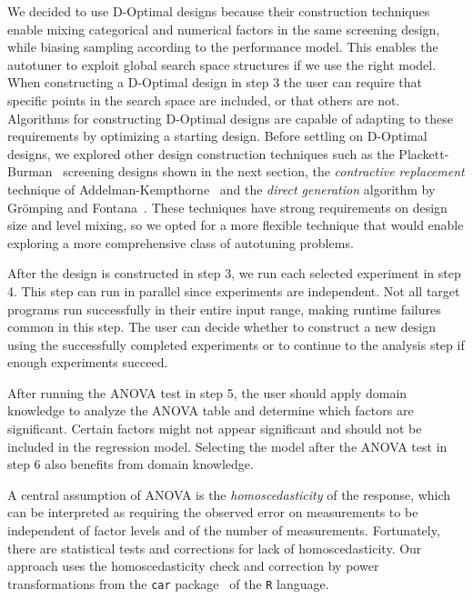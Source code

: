 \documentclass[conference]{IEEEtran}
\begin{document}
We decided to use D-Optimal designs because their construction techniques enable
mixing categorical  and numerical  factors in the  same screening  design, while
biasing sampling according to the  performance model. This enables the autotuner
to  exploit global  search space  structures  if we  use the  right model.  When
constructing a  D-Optimal design in  step 3 the  user can require  that specific
points in the search space are included,  or that others are not. Algorithms for
constructing D-Optimal designs are capable  of adapting to these requirements by
optimizing a starting design. Before  settling on D-Optimal designs, we explored
other      design       construction      techniques      such       as      the
Plackett-Burman~\cite{plackett1946design}  screening designs  shown in  the next
section,       the       \emph{contractive        replacement}       technique       of
Addelman-Kempthorne~\cite{addelman1961some} and the  \emph{direct generation} algorithm
by Grömping and Fontana~\cite{ulrike2018algorithm}. These techniques have strong
requirements on design  size and level mixing,  so we opted for  a more flexible
technique that would  enable exploring a more comprehensive  class of autotuning
problems.

After the design  is constructed in step  3, we run each  selected experiment in
step 4. This step can run in parallel since experiments are independent. Not all
target programs  run successfully  in their entire  input range,  making runtime
failures common  in this step.  The user can decide  whether to construct  a new
design  using the  successfully  completed  experiments or  to  continue to  the
analysis step if enough experiments succeed.

After running the ANOVA  test in step 5, the user  should apply domain knowledge
to analyze the ANOVA table and  determine which factors are significant. Certain
factors  might  not  appear  significant  and should  not  be  included  in  the
regression  model. Selecting  the model  after  the ANOVA  test in  step 6  also
benefits from domain knowledge.

A central assumption of ANOVA is the \emph{homoscedasticity} of the response, which can
be interpreted as requiring the observed error on measurements to be independent
of  factor levels  and of  the number  of measurements.  Fortunately, there  are
statistical tests  and corrections  for lack  of homoscedasticity.  Our approach
uses the homoscedasticity check and correction by power transformations from the
\texttt{car} package~\cite{fox2011car} of the \texttt{R} language.
\end{document}

